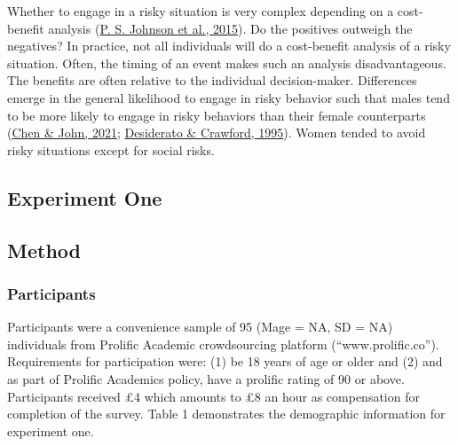\documentclass[
  donotrepeattitle,doc, 12pt, a4paper,floatsintext]{apa7}
\begin{document}
Whether to engage in a risky situation is very complex depending on a cost-benefit analysis (\protect\hyperlink{ref-johnson2015a}{P. S. Johnson et al., 2015}). Do the positives outweigh the negatives? In practice, not all individuals will do a cost-benefit analysis of a risky situation. Often, the timing of an event makes such an analysis disadvantageous. The benefits are often relative to the individual decision-maker. Differences emerge in the general likelihood to engage in risky behavior such that males tend to be more likely to engage in risky behaviors than their female counterparts (\protect\hyperlink{ref-chen2021}{Chen \& John, 2021}; \protect\hyperlink{ref-desiderato1995}{Desiderato \& Crawford, 1995}). Women tended to avoid risky situations except for social risks.

\hypertarget{experiment-one}{%
\subsection{Experiment One}\label{experiment-one}}

\hypertarget{method}{%
\subsection{Method}\label{method}}

\hypertarget{participants}{%
\subsubsection{Participants}\label{participants}}

Participants were a convenience sample of 95 (Mage = NA, SD = NA) individuals from Prolific Academic crowdsourcing platform (``www.prolific.co''). Requirements for participation were: (1) be 18 years of age or older and (2) and as part of Prolific Academics policy, have a prolific rating of 90 or above. Participants received £4 which amounts to £8 an hour as compensation for completion of the survey. Table 1 demonstrates the demographic information for experiment one.
\end{document}

